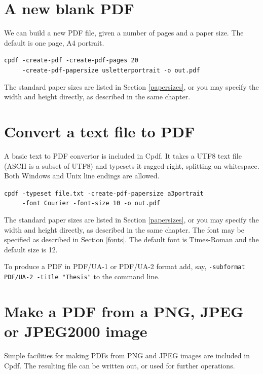 \documentclass{book}
\begin{document}
\section{A new blank PDF}

We can build a new PDF file, given a number of pages and a paper size. The default is one page, A4 portrait.

\begin{framed}
 \noindent\small\verb?cpdf -create-pdf -create-pdf-pages 20?\\
 \noindent\small\verb?     -create-pdf-papersize usletterportrait -o out.pdf?
\end{framed}

\noindent The standard paper sizes are listed in Section \ref{papersizes}, or you may specify the width and height directly, as described in the same chapter.

\section{Convert a text file to PDF}
A basic text to PDF convertor is included in Cpdf. It takes a UTF8 text file (ASCII is a subset of UTF8) and typesets it ragged-right, splitting on whitespace. Both Windows and Unix line endings are allowed. 

\begin{framed}
 \noindent\small\verb?cpdf -typeset file.txt -create-pdf-papersize a3portrait?\\
 \noindent\small\verb?     -font Courier -font-size 10 -o out.pdf?
\end{framed}

\noindent The standard paper sizes are listed in Section \ref{papersizes}, or you may specify the width and height directly, as described in the same chapter. The font may be specified as described in Section \ref{fonts}. The default font is Times-Roman and the default size is 12.

To produce a PDF in PDF/UA-1 or PDF/UA-2 format add, say, \texttt{-subformat PDF/UA-2 -title "Thesis"} to the command line.

\section{Make a PDF from a PNG, JPEG or JPEG2000 image}

Simple facilities for making PDFs from PNG and JPEG images are included in Cpdf. The resulting file can be written out, or used for further operations.
\end{document}
